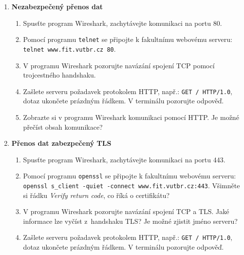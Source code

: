 \documentclass[a4paper,11pt]{article}
\begin{document}
\begin{enumerate}

  \item {\bf  Nezabezpečený přenos dat}

    \begin{enumerate}

      \item Spusťte program Wireshark, zachytávejte komunikaci na portu 80.

      \item Pomocí programu {\tt telnet} se připojte k fakultnímu webovému
        serveru: \\ \verb|telnet www.fit.vutbr.cz 80|.

      \item V programu Wireshark pozorujte navázání spojení TCP pomocí
        trojcestného handshaku.

      \item Zašlete serveru požadavek protokolem HTTP, např.:
        \verb|GET / HTTP/1.0|, dotaz ukončete prázdným řádkem. V terminálu pozorujte
        odpověď.

      \item Zobrazte si v programu Wireshark komunikaci pomocí HTTP. Je možné
        přečíst obsah komunikace?

    \end{enumerate}

  \item {\bf Přenos dat zabezpečený TLS}

    \begin{enumerate}

      \item Spusťte program Wireshark, zachytávejte komunikaci na portu 443.

      \item Pomocí programu {\tt openssl} se připojte k fakultnímu webovému
        serveru: \\ \verb|openssl s_client -quiet -connect www.fit.vutbr.cz:443|.
        Všimněte si řádku \emph{Verify return code}, co
        říká o certifikátu?

      \item V programu Wireshark pozorujte navázání spojení TCP a TLS. Jaké
        informace lze vyčíst z~handshaku TLS? Je možné zjistit jméno serveru?

      \item Zašlete serveru požadavek protokolem HTTP, např.:
        \verb|GET / HTTP/1.0|, dotaz ukončete prázdným řádkem. V terminálu pozorujte
        odpověď.


\end{enumerate}
\end{enumerate}
\end{document}
